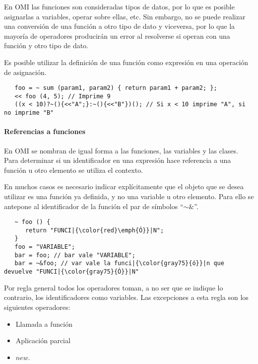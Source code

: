 En OMI las funciones son consideradas tipos de datos, por lo que es posible asignarlas 
a variables, operar sobre ellas, etc. Sin embargo, no se puede realizar una conversión
de una función a otro tipo de dato y viceversa, por lo que la mayoría de operadores producirán 
un error al resolverse si operan con una función y otro tipo de dato.

Es posible utilizar la definición de una función como expresión en una operación de asignación. \\

\begin{lstlisting}
   foo = ~ sum (param1, param2) { return param1 + param2; };
   << foo (4, 5); // Imprime 9
   ((x < 10)?~(){<<"A";}:~(){<<"B"})(); // Si x < 10 imprime "A", si no imprime "B"
\end{lstlisting}

\paragraph{Referencias a funciones }
En OMI se nombran de igual forma a las funciones, las variables y las clases. Para determinar 
si un identificador en una expresión hace referencia a una función u otro elemento se utiliza 
el contexto. 

En muchos casos es necesario indicar explícitamente que el objeto que se desea utilizar es una 
función ya definida, y no una variable u otro elemento. Para ello se antepone al identificador 
de la función el par de símbolos ``$\sim\&$''. \\




\begin{lstlisting}
   ~ foo () {
      return "FUNCI|{\color{red}\emph{Ó}}|N";
   }
   foo = "VARIABLE";
   bar = foo; // bar vale "VARIABLE";
   bar = ~&foo; // var vale la funci|{\color{gray75}{ó}}|n que devuelve "FUNCI|{\color{gray75}{Ó}}|N" 
\end{lstlisting}

Por regla general todos los operadores toman, a no ser que se indique lo contrario, 
los identificadores como variables. Las excepciones a esta regla son los 
siguientes operadores:

\begin {itemize}
   \item Llamada a función 
   \item Aplicación parcial
   \item $new$.
\end{itemize}

